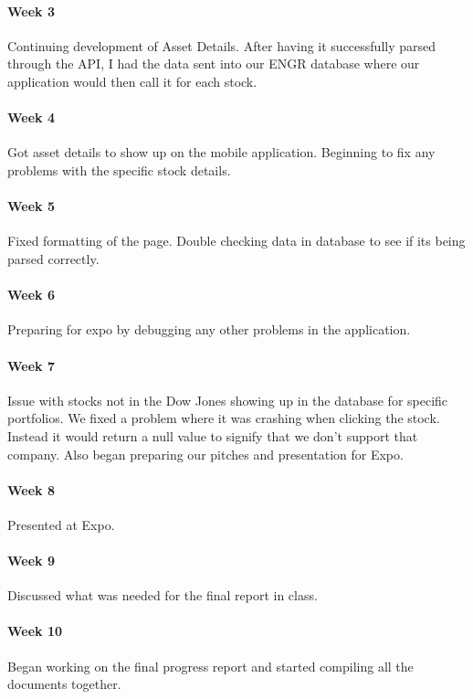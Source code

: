\documentclass[onecolumn, draftclsnofoot,10pt, compsoc]{IEEEtran}
\begin{document}
    \paragraph{Week 3}
    Continuing development of Asset Details. After having it successfully parsed through the API, I had the data sent into our ENGR database where our application would then call it for each stock. 

    \paragraph{Week 4} 
    Got asset details to show up on the mobile application. Beginning to fix any problems with the specific stock details.

    \paragraph{Week 5} 
    Fixed formatting of the page. Double checking data in database to see if its being parsed correctly.
    
    \paragraph{Week 6}
    Preparing for expo by debugging any other problems in the application. 
    
    \paragraph{Week 7}
    Issue with stocks not in the Dow Jones showing up in the database for specific portfolios. We fixed a problem where it was crashing when clicking the stock. Instead it would return a null value to signify that we don't support that company. Also began preparing our pitches and presentation for Expo.
    
    \paragraph{Week 8} 
    Presented at Expo. 
    
    \paragraph{Week 9}
    Discussed what was needed for the final report in class.
    
    \paragraph{Week 10} 
    Began working on the final progress report and started compiling all the documents together. 
\end{document}
